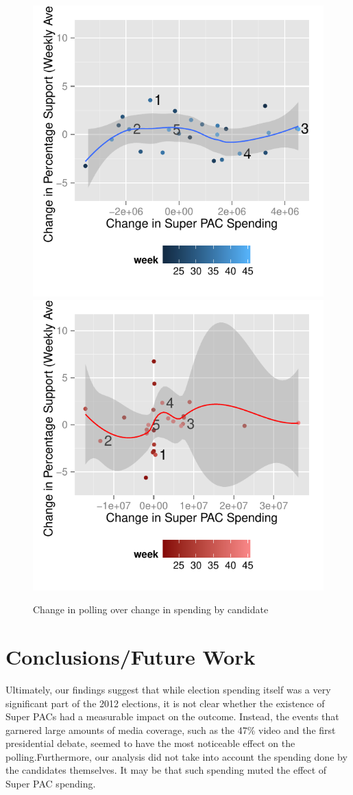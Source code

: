 \documentclass[11pt]{article}\usepackage{graphicx, color}
\newenvironment{knitrout}{}{} %
\begin{document}
\begin{knitrout}
\color{fgcolor}\begin{figure}[H]
\includegraphics[width=.45\textwidth]{figure/support_spend1} \includegraphics[width=.45\textwidth]{figure/support_spend2} \caption[Change in polling over change in spending by candidate]{Change in polling over change in spending by candidate\label{fig:support_spend}}
\end{figure}

\end{knitrout}


\section{Conclusions/Future Work}
Ultimately, our findings suggest that while election spending itself was a very significant part of the 2012 elections, it is not clear whether the existence of Super PACs had a measurable impact on the outcome. Instead, the events that garnered large amounts of media coverage, such as the 47\% video and the first presidential debate, seemed to have the most noticeable effect on the polling.Furthermore, our analysis did not take into account the spending done by the candidates themselves. It may be that such spending muted the effect of Super PAC spending.
\end{document}
